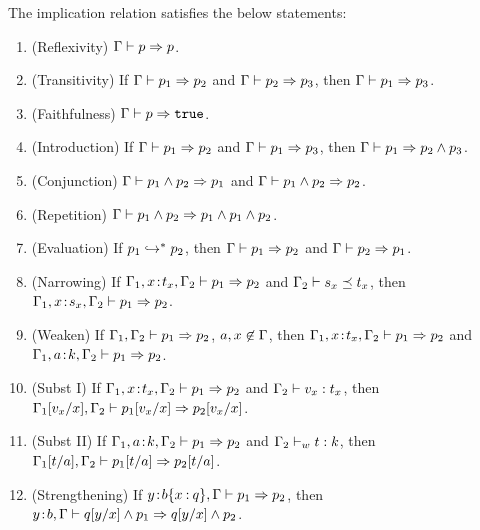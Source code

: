 \begin{requirement}\label{lem:implication}
  The implication relation satisfies the below statements:
  \begin{enumerate}
      \item (Reflexivity) ${\mathrm{\Gamma}} \vdash {\ensuremath{p}} \Rightarrow {\ensuremath{p}}$.
      \item (Transitivity) If $\imply{\tcenv}{\spred_1}{\spred_2}$
        and $\imply{\tcenv}{\spred_2}{\spred_3}$, then
        $\imply{\tcenv}{\spred_1}{\spred_3}$.
      \item (Faithfulness) ${\mathrm{\Gamma}} \vdash {\ensuremath{p}} \Rightarrow {\ensuremath{\mathtt{true}}}$.
      \item (Introduction) If $\imply{\tcenv}{\spred_1}{\spred_2}$
        and $\imply{\tcenv}{\spred_1}{\spred_3}$, then
        $\imply{\tcenv}{\spred_1}{\csand{\spred_2}{\spred_3}}$.
      \item (Conjunction)
      $\imply{\tcenv}{\csand{\spred_1}{\spred_2}}{\spred_1}$ and
      $\imply{\tcenv}{\csand{\spred_1}{\spred_2}}{\spred_2}$.
      \item (Repetition)
      $\imply{\tcenv}{\csand{\spred_1}{\spred_2}}
                     {\csand{\spred_1}{\csand{\spred_1}{\spred_2}}}$.
      \item (Evaluation) If ${p_1} \hookrightarrow^{*} {p_2}$, 
        then $\imply{\tcenv}{\spred_1}{\spred_2}$
        and  $\imply{\tcenv}{\spred_2}{\spred_1}$.
      \item (Narrowing) If
      $\imply{\tcenv_1,\bind{x}{t_x},\tcenv_2}{\spred_1}{\spred_2}$
      and ${\mathrm{\Gamma}_2} \vdash s_x \preceq t_x$, then
      $\imply{\tcenv_1,\bind{x}{s_x},\tcenv_2}{\spred_1}{\spred_2}$.
      \item (Weaken) If
      $\imply{\tcenv_1,\tcenv_2}{\spred_1}{\spred_2}$,
       $a,x\not\in\mathrm{\Gamma}$, then
      $\imply{\tcenv_1,\bind{x}{t_x},\tcenv_2}{\spred_1}{\spred_2}$ and
      $\imply{\tcenv_1,\bind{a}{k},\tcenv_2}{\spred_1}{\spred_2}$.
      \item (Subst I) If
      $\imply{\tcenv_1,\bind{x}{t_x},\tcenv_2}{\spred_1}{\spred_2}$
      and ${\mathrm{\Gamma}_2} \vdash {v_x} : {t_x}$, then
      $\imply{\subst{\tcenv_1}{x}{v_x},\tcenv_2}{\subst{\spred_1}{x}{v_x}}
                                             {\subst{\spred_2}{x}{v_x}}$.
      \item (Subst II) If $\imply{\tcenv_1,\bind{a}{k},\tcenv_2}{\spred_1}{\spred_2}$
      and ${\mathrm{\Gamma}_2} \vdash_w {t} : {k}$, then
      $\imply{\subst{\tcenv_1}{a}{t},\tcenv_2}{\subst{\spred_1}{a}{t}}
      {\subst{\spred_2}{a}{t}}$.
      \item (Strengthening) If
      $\imply{\bind{y}{\breft{\sbase}{x}{q},\tcenv}}{\spred_1}{\spred_2}$,
      then $\imply{\bind{y}{\sbase},\tcenv}{\csand{\subst{q}{x}{y}}{\spred_1}}
                  {\csand{\subst{q}{x}{y}}{\spred_2}}$.
  \end{enumerate}
\end{requirement}

